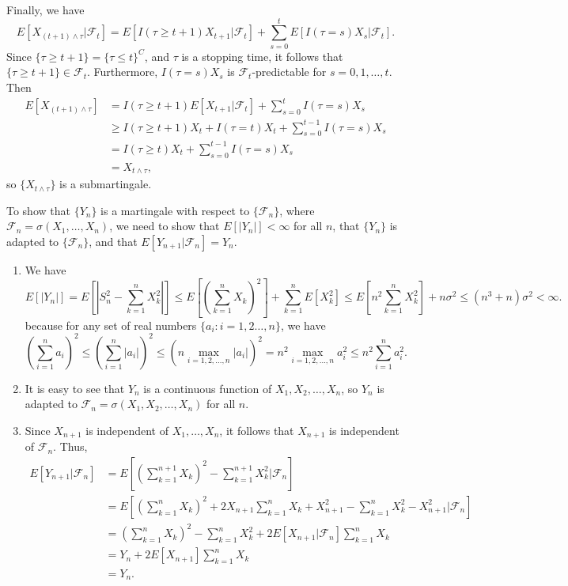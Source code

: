 \documentclass{homework}
\newcommand{\fil}{\mathcal{F}}
\begin{document}
	Finally, we have
	\begin{equation*}
		E[X_{(t+1)\wedge\tau}|\fil_t] = E[I(\tau\ge t+1)X_{t+1}|\fil_t] + \sum_{s=0}^{t} E[I(\tau=s)X_s |\fil_t].
	\end{equation*}
	Since $\{\tau \ge t+1\} = \{\tau \le t\}^C$, and $\tau$ is a stopping time, it follows that $\{\tau \ge t+1\} \in \fil_t$. Furthermore, $I(\tau=s)X_s$ is $\fil_t$-predictable for $s=0,1,\dots, t$. Then
	\begin{align*}
		E[X_{(t+1)\wedge\tau}] &= I(\tau\ge t+1)E[X_{t+1}|\fil_t] + \sum_{s=0}^tI(\tau=s)X_s \\
		&\ge I(\tau\ge t+1)X_t + I(\tau=t)X_t + \sum_{s=0}^{t-1}I(\tau=s)X_s \\
		& = I(\tau \ge t)X_t + \sum_{s=0}^{t-1}I(\tau=s)X_s \\
		&= X_{t\wedge \tau},
	\end{align*}
	so $\{X_{t\wedge\tau}\}$ is a submartingale.
	
	\question To show that $\{Y_n\}$ is a martingale with respect to $\{\fil_n\}$, where $\fil_n = \sigma(X_1,\dots, X_n)$, we need to show that $E[|Y_n|] < \infty$ for all $n$, that $\{Y_n\}$ is adapted to $\{\fil_n\}$, and that $E[Y_{n+1}|\fil_n] = Y_n$.
	\begin{enumerate}
		\item We have
			\begin{equation*}
				E[|Y_n|] = E\left[\left|S_n^2 - \sum_{k=1}^nX_k^2\right|\right] \le E\left[\left(\sum_{k=1}^nX_k\right)^2\right] + \sum_{k=1}^nE[X_k^2] \le E\left[n^2\sum_{k=1}^nX_k^2\right] + n\sigma^2 \le (n^3+n)\sigma^2 < \infty.
			\end{equation*}
		because for any set of real numbers $\{a_i : i=1,2\dots,n\}$, we have
		\begin{equation*}
			\left(\sum_{i=1}^na_i\right)^2 \le \left(\sum_{i=1}^n |a_i|\right)^2 \le \left(n\max_{i=1,2,\dots,n}|a_i|\right)^2 = n^2\max_{i=1,2,\dots,n}a_i^2 \le n^2\sum_{i=1}^na_i^2.
		\end{equation*}
		\item It is easy to see that $Y_n$ is a continuous function of $X_1,X_2,\dots, X_n$, so $Y_n$ is adapted to $\fil_n = \sigma(X_1,X_2,\dots,X_n)$ for all $n$.
		\item Since $X_{n+1}$ is independent of $X_1,\dots, X_n$, it follows that $X_{n+1}$ is independent of $\fil_n$. Thus,
		\begin{equation*}
			\begin{aligned}
			E[Y_{n+1}|\fil_n] &= E\left[\left(\sum_{k=1}^{n+1}X_k\right)^2 - \sum_{k=1}^{n+1}X_k^2\Bigg|\fil_n\right] \\[0.5em]
			&= E\left[\left(\sum_{k=1}^nX_k\right)^2 + 2X_{n+1}\sum_{k=1}^nX_k + X_{n+1}^2 - \sum_{k=1}^nX_k^2 - X_{n+1}^2\Bigg|\fil_n\right] \\[0.5em]
			&= \left(\sum_{k=1}^nX_k\right)^2 - \sum_{k=1}^nX_k^2 + 2E[X_{n+1}|\fil_n]\sum_{k=1}^nX_k \\
			&= Y_n + 2E[X_{n+1}]\sum_{k=1}^nX_k \\
			&= Y_n.
			\end{aligned}
		\end{equation*}
	\end{enumerate}
	
\end{document}

